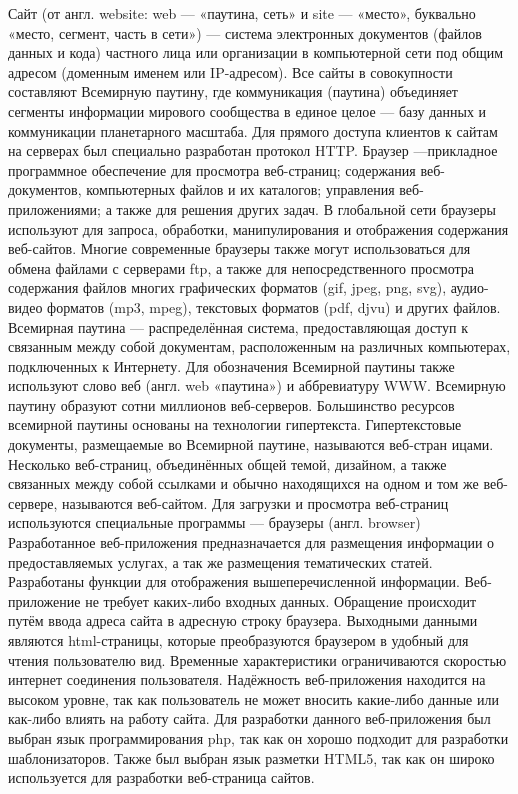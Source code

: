 \hspace{1.25cm} Сайт (от англ. website: web — «паутина, сеть» и site — «место», буквально «место, сегмент, часть в сети») — система электронных документов (файлов данных и кода) частного лица или организации в компьютерной сети под общим адресом (доменным именем или IP-адресом).
Все сайты в совокупности составляют Всемирную паутину, где коммуникация (паутина) объединяет сегменты информации мирового сообщества в единое целое — базу данных и коммуникации планетарного масштаба. Для прямого доступа клиентов к сайтам на серверах был специально разработан протокол HTTP.
	Браузер —прикладное программное обеспечение для просмотра веб-страниц; содержания веб-документов, компьютерных файлов и их каталогов; управления веб-приложениями; а также для решения других задач. В глобальной сети браузеры используют для запроса, обработки, манипулирования и отображения содержания веб-сайтов. Многие современные браузеры также могут использоваться для обмена файлами с серверами ftp, а также для непосредственного просмотра содержания файлов многих графических форматов (gif, jpeg, png, svg), аудио-видео форматов (mp3, mpeg), текстовых форматов (pdf, djvu) и других файлов.
	Всемирная паутина  — распределённая система, предоставляющая доступ к связанным между собой документам, расположенным на различных компьютерах, подключенных к Интернету. Для обозначения Всемирной паутины также используют слово веб (англ. web «паутина») и аббревиатуру WWW. Всемирную паутину образуют сотни миллионов веб-серверов. Большинство ресурсов всемирной паутины основаны на технологии гипертекста. Гипертекстовые документы, размещаемые во Всемирной паутине, называются веб-стран	ицами. Несколько веб-страниц, объединённых общей темой, дизайном, а также связанных между собой ссылками и обычно находящихся на одном и том же веб-сервере, называются веб-сайтом. Для загрузки и просмотра веб-страниц используются специальные программы — браузеры (англ. browser)
 Разработанное веб-приложения предназначается для размещения информации о предоставляемых услугах, а так же размещения тематических статей.
Разработаны функции для отображения вышеперечисленной информации.
Веб-приложение не требует каких-либо входных данных. Обращение происходит путём ввода адреса сайта в адресную строку браузера.
Выходными данными являются html-страницы, которые преобразуются браузером в удобный для чтения пользователю вид.
Временные характеристики ограничиваются скоростью интернет соединения пользователя.
Надёжность веб-приложения находится на высоком уровне, так как пользователь не может вносить какие-либо данные или как-либо влиять на работу сайта.
Для разработки данного веб-приложения был выбран язык программирования php, так как он хорошо подходит для разработки шаблонизаторов. Также был выбран язык разметки HTML5, так как он широко используется для разработки веб-страница сайтов.